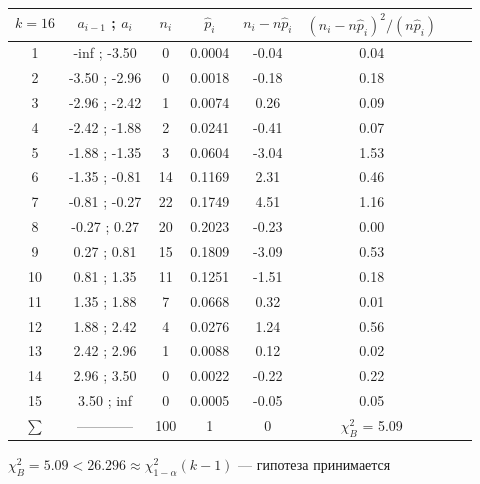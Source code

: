 \documentclass[12pt]{article}
\begin{document}
\begin{center}
    \begin{tabular}{ | c | c | c | c | c | c | c | c |}
        \hline
        $k = 16$ & $a_{i - 1}$ ; $a_{i}$ & $n_i$ & $\hat p_i$ & $n_i - n \hat p_i$ & $(n_i - n \hat p_i)^2/(n \hat p_i)$ \\ \hline
        1  &  -inf ; -3.50  &  0  &  0.0004  &  -0.04  &  0.04  \\ \hline
        2  &  -3.50 ; -2.96  &  0  &  0.0018  &  -0.18  &  0.18 \\ \hline
        3  &  -2.96 ; -2.42  &  1  &  0.0074  &  0.26  &  0.09  \\ \hline
        4  &  -2.42 ; -1.88  &  2  &  0.0241  &  -0.41  &  0.07 \\ \hline
        5  &  -1.88 ; -1.35  &  3  &  0.0604  &  -3.04  &  1.53 \\ \hline
        6  &  -1.35 ; -0.81  &  14  &  0.1169  &  2.31  &  0.46 \\ \hline
        7  &  -0.81 ; -0.27  &  22  &  0.1749  &  4.51  &  1.16 \\ \hline
        8  &  -0.27 ; 0.27  &  20  &  0.2023  &  -0.23  &  0.00 \\ \hline
        9  &  0.27 ; 0.81  &  15  &  0.1809  &  -3.09  &  0.53  \\ \hline
        10  &  0.81 ; 1.35  &  11  &  0.1251  &  -1.51  &  0.18 \\ \hline
        11  &  1.35 ; 1.88  &  7  &  0.0668  &  0.32  &  0.01   \\ \hline
        12  &  1.88 ; 2.42  &  4  &  0.0276  &  1.24  &  0.56   \\ \hline
        13  &  2.42 ; 2.96  &  1  &  0.0088  &  0.12  &  0.02   \\ \hline
        14  &  2.96 ; 3.50  &  0  &  0.0022  &  -0.22  &  0.22  \\ \hline
        15  &  3.50 ; inf  &  0  &  0.0005  &  -0.05  &  0.05   \\ \hline
        $\sum$ &  –––––––– &  100  &  1  & 0 & $\chi^2_{B}$ = 5.09 \\ \hline
    \end{tabular}
\end{center}

$\chi^2_{B} = 5.09 < 26.296 \approx \chi^2_{1 - \alpha}(k - 1)$ –– гипотеза принимается

\newpage
{}
\end{document}
